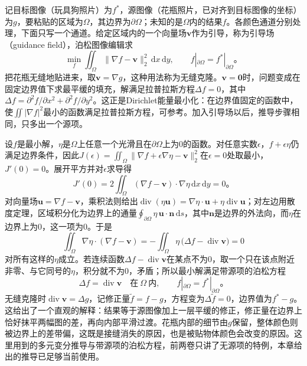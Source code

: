 记目标图像（玩具狗照片）为$f^*$，源图像（花瓶照片，已对齐到目标图像的坐标）为$g$，要粘贴的区域为$\Omega$，其边界为$\partial\Omega$；未知的是$\Omega$内的结果$f$。各颜色通道分别处理，下面只写一个通道。给定区域内的一个向量场$\bm{v}$作为引导，称为引导场（guidance field），泊松图像编辑求
\begin{equation}
 \min_{f}\iint_{\Omega}\lVert\nabla f-\bm{v}\rVert_2^2\,\mathrm{d}x\,\mathrm{d}y,
 \qquad f|_{\partial\Omega}=f^*|_{\partial\Omega}\text{。}
 \label{eq:vision-poisson-variational}
\end{equation}
把花瓶无缝地贴进来，取$\bm{v}=\nabla g$，这种用法称为无缝克隆。$\bm{v}=\bm{0}$时，问题变成在固定边界值下求最平缓的填充，解满足拉普拉斯方程$\Delta f=0$，其中$\Delta f=\partial^2f/\partial x^2+\partial^2f/\partial y^2$。这正是Dirichlet能量最小化：在边界值固定的函数中，使$\iint|\nabla f|^2$最小的函数满足拉普拉斯方程，可参考。加入引导场以后，推导步骤相同，只多出一个源项。

设$f$是最小解，$\eta$是$\Omega$上任意一个光滑且在$\partial\Omega$上为0的函数。对任意实数$\epsilon$，$f+\epsilon\eta$仍满足边界条件，因此$J(\epsilon)=\iint_{\Omega}\lVert\nabla f+\epsilon\nabla\eta-\bm{v}\rVert_2^2$在$\epsilon=0$处取最小，$J'(0)=0$。展开平方并对$\epsilon$求导得
\begin{equation*}
 J'(0)=2\iint_{\Omega}(\nabla f-\bm{v})\cdot\nabla\eta\,\mathrm{d}x\,\mathrm{d}y=0\text{。}
\end{equation*}
对向量场$\bm{u}=\nabla f-\bm{v}$，乘积法则给出$\operatorname{div}(\eta\bm{u})=\nabla\eta\cdot\bm{u}+\eta\operatorname{div}\bm{u}$；对左边用散度定理，区域积分化为边界上的通量$\oint_{\partial\Omega}\eta\,\bm{u}\cdot\bm{n}\,\mathrm{d}s$，其中$\bm{n}$是边界的外法向，而$\eta$在边界上为0，这一项为0。于是
\begin{equation*}
 \iint_{\Omega}\nabla\eta\cdot(\nabla f-\bm{v})
 =-\iint_{\Omega}\eta\,\bigl(\Delta f-\operatorname{div}\bm{v}\bigr)=0
\end{equation*}
对所有这样的$\eta$成立。若连续函数$\Delta f-\operatorname{div}\bm{v}$在某点不为0，取一个只在该点附近非零、与它同号的$\eta$，积分就不为0，矛盾；所以最小解满足带源项的泊松方程
\begin{equation}
 \Delta f=\operatorname{div}\bm{v}\quad\text{在}\ \Omega\ \text{内},
 \qquad f|_{\partial\Omega}=f^*|_{\partial\Omega}\text{。}
 \label{eq:vision-poisson-equation}
\end{equation}
无缝克隆时$\operatorname{div}\bm{v}=\Delta g$，记修正量$\tilde f=f-g$，方程变为$\Delta\tilde f=0$，边界值为$f^*-g$。这给出了一个直观的解释：结果等于源图像加上一层平缓的修正，修正量在边界上恰好抹平两幅图的差，再向内部平滑过渡。花瓶内部的细节由$g$保留，整体颜色则被边界上的差带偏，这既是接缝消失的原因，也是被贴物体颜色会改变的原因。这里用到的多元变分推导与带源项的泊松方程，前两卷只讲了无源项的特例，本章给出的推导已足够当前使用。

